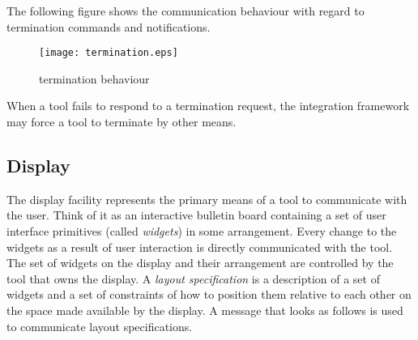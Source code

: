 \documentclass{article}
\begin{document}
   The following figure shows the communication behaviour with regard to
   termination commands and notifications.

   \begin{figure}[H]
    \begin{center}
     \texttt{[image: termination.eps]}
    \end{center}
    \vspace{-0.5cm}
    \caption{termination behaviour}
   \end{figure} 
   
   \noindent When a tool fails to respond to a termination request, the
   integration framework may force a tool to terminate by other means.

  \subsection{Display} \label{ss:user_interaction}

   The display facility represents the primary means of a tool to communicate
   with the user.  Think of it as an interactive bulletin board containing a
   set of user interface primitives (called \textit{widgets}) in some
   arrangement.  Every change to the widgets as a result of user interaction is
   directly communicated with the tool.  The set of widgets on the display and
   their arrangement are controlled by the tool that owns the display.  A
   \textit{layout specification} is a description of a set of widgets and a set
   of constraints of how to position them relative to each other on the space
   made available by the display. A message that looks as follows is used to
   communicate layout specifications.
   
\end{document}
